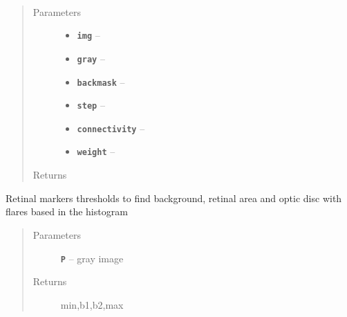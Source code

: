 \documentclass[letterpaper,10pt,english]{sphinxmanual}
\begin{document}

\begin{fulllineitems}
\label{RRtoolbox.tools:RRtoolbox.tools.segmentation.layeredfloods}~\begin{quote}\begin{description}
\item[{Parameters}] \leavevmode\begin{itemize}
\item {} 
\textbf{\texttt{img}} -- 

\item {} 
\textbf{\texttt{gray}} -- 

\item {} 
\textbf{\texttt{backmask}} -- 

\item {} 
\textbf{\texttt{step}} -- 

\item {} 
\textbf{\texttt{connectivity}} -- 

\item {} 
\textbf{\texttt{weight}} -- 

\end{itemize}

\item[{Returns}] \leavevmode


\end{description}\end{quote}

\end{fulllineitems}


\begin{fulllineitems}
\label{RRtoolbox.tools:RRtoolbox.tools.segmentation.retina_markers_thresh}
Retinal markers thresholds to find background,
retinal area and optic disc with flares based
in the histogram
\begin{quote}\begin{description}
\item[{Parameters}] \leavevmode
\textbf{\texttt{P}} -- gray image

\item[{Returns}] \leavevmode
min,b1,b2,max

\end{description}\end{quote}

\end{fulllineitems}
\end{document}
